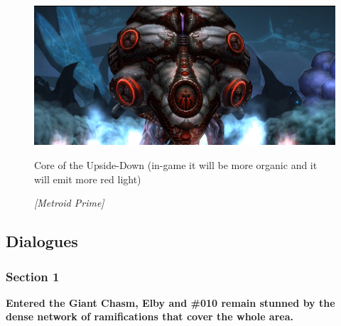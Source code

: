 \vspace*{0.3cm}
\begin{figure}[H]
	\centering
	\includegraphics[width=0.8\linewidth]{images/visual_ref/15_giant_chasm/chasm_core.png}
	\caption*{Core of the Upside-Down (in-game it will be more organic and it will emit more red light)}
	\caption{ \textit{[Metroid Prime]}}
\end{figure}

\subsection{Dialogues}

\subsubsection{Section 1}
\vspace*{0.3cm}

	\textbf{Entered the Giant Chasm, Elby and \#010 remain stunned by the dense network of ramifications that cover the whole area.}

